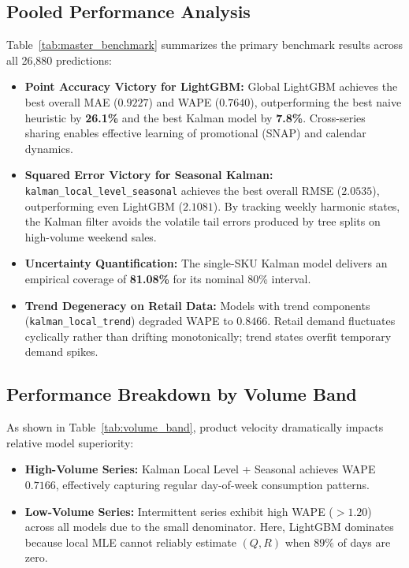 \documentclass[conference]{IEEEtran}
\begin{document}
\subsection{Pooled Performance Analysis}
Table~\ref{tab:master_benchmark} summarizes the primary benchmark results across all 26,880 predictions:
\begin{itemize}
    \item \textbf{Point Accuracy Victory for LightGBM:} Global LightGBM achieves the best overall MAE ($0.9227$) and WAPE ($0.7640$), outperforming the best naive heuristic by \textbf{26.1\%} and the best Kalman model by \textbf{7.8\%}. Cross-series sharing enables effective learning of promotional (SNAP) and calendar dynamics.
    \item \textbf{Squared Error Victory for Seasonal Kalman:} \texttt{kalman\_local\_level\_seasonal} achieves the best overall RMSE ($2.0535$), outperforming even LightGBM ($2.1081$). By tracking weekly harmonic states, the Kalman filter avoids the volatile tail errors produced by tree splits on high-volume weekend sales.
    \item \textbf{Uncertainty Quantification:} The single-SKU Kalman model delivers an empirical coverage of \textbf{81.08\%} for its nominal 80\% interval.
    \item \textbf{Trend Degeneracy on Retail Data:} Models with trend components (\texttt{kalman\_local\_trend}) degraded WAPE to $0.8466$. Retail demand fluctuates cyclically rather than drifting monotonically; trend states overfit temporary demand spikes.
\end{itemize}

\subsection{Performance Breakdown by Volume Band}
As shown in Table~\ref{tab:volume_band}, product velocity dramatically impacts relative model superiority:
\begin{itemize}
    \item \textbf{High-Volume Series:} Kalman Local Level + Seasonal achieves WAPE $0.7166$, effectively capturing regular day-of-week consumption patterns.
    \item \textbf{Low-Volume Series:} Intermittent series exhibit high WAPE ($> 1.20$) across all models due to the small denominator. Here, LightGBM dominates because local MLE cannot reliably estimate $(Q, R)$ when $89\%$ of days are zero.
\end{itemize}
\end{document}
